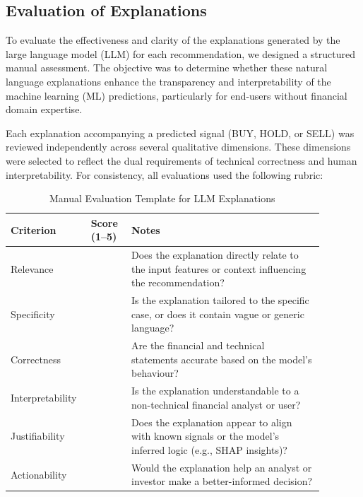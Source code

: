 \subsection{Evaluation of Explanations}

To evaluate the effectiveness and clarity of the explanations generated by the large language model (LLM) for each recommendation, we designed a structured manual assessment. The objective was to determine whether these natural language explanations enhance the transparency and interpretability of the machine learning (ML) predictions, particularly for end-users without financial domain expertise.

Each explanation accompanying a predicted signal (BUY, HOLD, or SELL) was reviewed independently across several qualitative dimensions. These dimensions were selected to reflect the dual requirements of technical correctness and human interpretability. For consistency, all evaluations used the following rubric:

\begin{table}[h]
  \centering
  \caption{Manual Evaluation Template for LLM Explanations}
  \label{tab:llm_eval_template}
  \begin{tabular}{|p{0.18\linewidth}|p{0.12\linewidth}|p{0.58\linewidth}|}
    \hline
    \textbf{Criterion} & \textbf{Score (1–5)} & \textbf{Notes} \\
    \hline
    Relevance &  & Does the explanation directly relate to the input features or context influencing the recommendation? \\
    \hline
    Specificity &  & Is the explanation tailored to the specific case, or does it contain vague or generic language? \\
    \hline
    Correctness &  & Are the financial and technical statements accurate based on the model's behaviour? \\
    \hline
    Interpretability &  & Is the explanation understandable to a non-technical financial analyst or user? \\
    \hline
    Justifiability &  & Does the explanation appear to align with known signals or the model’s inferred logic (e.g., SHAP insights)? \\
    \hline
    Actionability &  & Would the explanation help an analyst or investor make a better-informed decision? \\
    \hline
  \end{tabular}
\end{table}
\FloatBarrier

